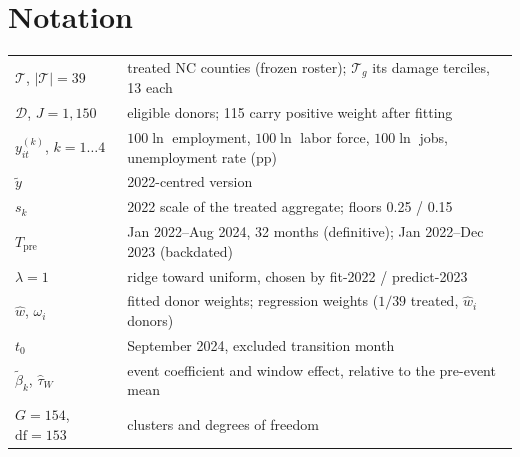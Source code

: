 \documentclass[11pt,a4paper]{article}
\newcommand{\Tr}{\mathcal{T}}
\newcommand{\Dn}{\mathcal{D}}
\begin{document}
\appendix
\section{Notation}
\begin{center}\small
\begin{tabular}{ll}
\toprule
$\Tr$, $|\Tr|=39$ & treated NC counties (frozen roster); $\Tr_g$ its damage terciles, 13 each\\
$\Dn$, $J=1{,}150$ & eligible donors; 115 carry positive weight after fitting\\
$y^{(k)}_{it}$, $k=1\dots4$ & $100\ln$ employment, $100\ln$ labor force, $100\ln$ jobs, unemployment rate (pp)\\
$\tilde y$ & 2022-centred version\\
$s_k$ & 2022 scale of the treated aggregate; floors 0.25 / 0.15\\
$T_{\text{pre}}$ & Jan 2022--Aug 2024, 32 months (definitive); Jan 2022--Dec 2023 (backdated)\\
$\lambda=1$ & ridge toward uniform, chosen by fit-2022 / predict-2023\\
$\widehat w$, $\omega_i$ & fitted donor weights; regression weights ($1/39$ treated, $\widehat w_i$ donors)\\
$t_0$ & September 2024, excluded transition month\\
$\tilde\beta_k$, $\widehat\tau_W$ & event coefficient and window effect, relative to the pre-event mean\\
$G=154$, $\mathrm{df}=153$ & clusters and degrees of freedom\\
\bottomrule
\end{tabular}
\end{center}
\end{document}
